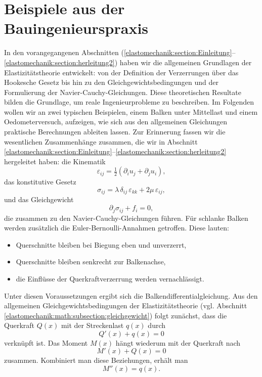 %
%
%
%
\section{Beispiele aus der Bauingenieurspraxis}
\label{elastomechanik:section:teil4}
In den vorangegangenen Abschnitten
(\ref{elastomechanik:section:Einleitung}--\ref{elastomechanik:section:herleitung2})
haben wir die allgemeinen Grundlagen der Elastizitätstheorie entwickelt: 
von der Definition der Verzerrungen über das Hookesche Gesetz bis hin zu den Gleichgewichtsbedingungen und der Formulierung der Navier-Cauchy-Gleichungen. 
Diese theoretischen Resultate bilden die Grundlage, um reale Ingenieurprobleme zu beschreiben. 
Im Folgenden wollen wir an zwei typischen Beispielen, einem Balken unter Mittellast und einem Oedometerversuch, aufzeigen, wie sich aus den allgemeinen Gleichungen praktische Berechnungen ableiten lassen. 
Zur Erinnerung fassen wir die wesentlichen Zusammenhänge zusammen,
die wir in Abschnitt
\ref{elastomechanik:section:Einleitung}--\ref{elastomechanik:section:herleitung2}
hergeleitet haben:
die Kinematik
\[
  \varepsilon_{ij} = \tfrac12(\partial_i u_j + \partial_j u_i),
\]
das konstitutive Gesetz
\[
  \sigma_{ij} = \lambda\, \delta_{ij}\,\varepsilon_{kk} + 2\mu\, \varepsilon_{ij},
\]
und das Gleichgewicht
\[
  \partial_j \sigma_{ij} + f_i = 0,
\]
die zusammen zu den Navier-Cauchy-Gleichungen führen.
Für schlanke Balken werden zusätzlich die Euler-Bernoulli-Annahmen getroffen. 
Diese lauten:
\begin{itemize}
  \item Querschnitte bleiben bei Biegung eben und unverzerrt,
  \item Querschnitte bleiben senkrecht zur Balkenachse,
  \item die Einflüsse der Querkraftverzerrung werden vernachlässigt.
\end{itemize}
Unter diesen Voraussetzungen ergibt sich die Balkendifferentialgleichung. 
Aus den allgemeinen Gleichgewichtsbedingungen der Elastizitätstheorie 
(vgl. Abschnitt
\ref{elastomechanik:math:subsection:gleichgewicht})
folgt zunächst, dass die Querkraft \(Q(x)\) mit der 
Streckenlast \(q(x)\) durch
\[
  Q'(x) + q(x) = 0
\]
verknüpft ist.
Das Moment \(M(x)\) hängt wiederum mit der Querkraft nach
\[
  M'(x) + Q(x) = 0
\]
zusammen.
Kombiniert man diese Beziehungen, erhält man
\begin{equation*}
  M''(x) = q(x).
\label{elastomechanik:eqn:Mpp}
\end{equation*}

